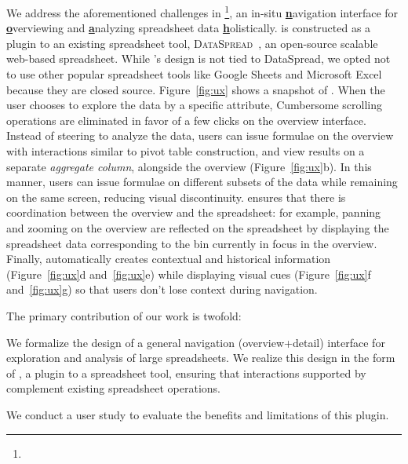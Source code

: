  We address the aforementioned challenges
in \noah\footnote{},
an in-situ
\textbf{\underline{n}}avigation interface
for \textbf{\underline{o}}verviewing
and \textbf{\underline{a}}nalyzing
spreadsheet data \textbf{\underline{h}}olistically.
\noah is constructed as a plugin to
an existing spreadsheet tool,
{\scshape DataSpread}~\cite{dataspread},
an open-source scalable web-based spreadsheet.
While \noah's design is not tied to {\sc DataSpread},
we opted not to use other popular spreadsheet
tools like Google Sheets and Microsoft Excel because they
are closed source.
Figure~\ref{fig:ux} shows a snapshot of \noah.
When the user chooses to explore
the data by a specific attribute,
Cumbersome scrolling operations are eliminated in favor
of a few clicks on the overview interface. Instead of steering to analyze the data,
users can issue formulae
on the overview with interactions similar to pivot table construction,
and view results on a separate {\em aggregate column},
alongside the overview (Figure~\ref{fig:ux}b). 
In this manner,
users can issue formulae on different
subsets of the data while remaining on the same screen,
reducing visual discontinuity.
\noah ensures that there is coordination between
the overview and the spreadsheet:
for example, panning and zooming on the overview
are reflected on the spreadsheet by displaying
the spreadsheet data corresponding to the bin
currently in focus in the overview.
Finally, \noah automatically creates
contextual and historical information
(Figure~\ref{fig:ux}d and~\ref{fig:ux}e)
while displaying visual cues
(Figure~\ref{fig:ux}f and~\ref{fig:ux}g)
so that users don't lose context during navigation.

The primary contribution of our work is twofold:
\squishlist
\item We formalize the design of a general
navigation (overview+detail) interface
for exploration and analysis of large spreadsheets.
We realize this design in the form of \noah,
a plugin to a spreadsheet tool,
ensuring that interactions supported by \noah
complement existing spreadsheet operations.
\item We conduct a user study to evaluate
the benefits and limitations of this plugin.
\squishend


